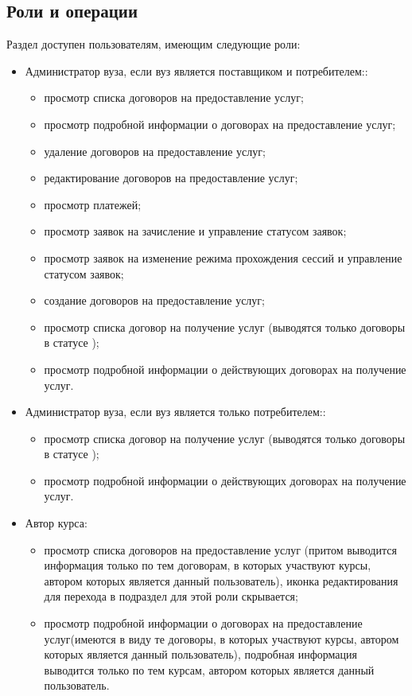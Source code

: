 \subsection{Роли и операции}
Раздел доступен пользователям, имеющим следующие роли:	
	\begin{itemize}
		\item Администратор вуза, если вуз является поставщиком и потребителем::
		\begin{itemize}
			\item просмотр списка договоров на предоставление услуг;
			\item просмотр подробной информации о договорах на предоставление услуг;
			\item удаление договоров на предоставление услуг;
			\item редактирование договоров на предоставление услуг;
			\item просмотр платежей;
			\item просмотр заявок на зачисление и управление статусом заявок;
			\item просмотр заявок на изменение режима прохождения сессий и управление статусом заявок;
			\item создание договоров на предоставление услуг;
			\item просмотр списка договор на получение услуг (выводятся только договоры в статусе ); 
			\item просмотр подробной информации о действующих договорах на получение услуг.
		\end{itemize}
		\item Администратор вуза, если вуз является только потребителем::
		\begin{itemize}
			\item просмотр списка договор на получение услуг (выводятся только договоры в статусе ); 
			\item просмотр подробной информации о действующих договорах на получение услуг.
		\end{itemize}
		\item Автор курса:
		\begin{itemize}
			\item просмотр списка договоров на предоставление услуг (притом выводится информация только по тем договорам, в которых участвуют курсы, автором которых является данный пользователь), иконка редактирования для перехода в подраздел  для этой роли скрывается;
			\item просмотр подробной информации о договорах на предоставление услуг(имеются в виду те договоры, в которых участвуют курсы, автором которых является данный пользователь), подробная информация выводится только по тем курсам, автором которых является данный пользователь.
		\end{itemize}						
	\end{itemize} 
	
